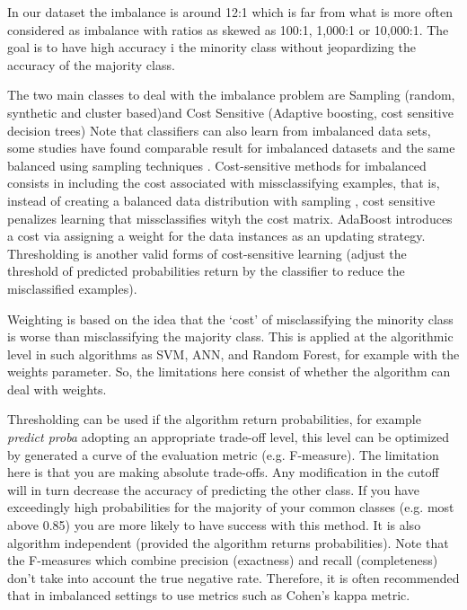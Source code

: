 \documentclass[11pt]{article}
\theoremstyle{definition}
\theoremstyle{remark}
\begin{document}
In our dataset the imbalance is around 12:1 which is far from what is more often considered as imbalance with ratios as skewed as 100:1, 1,000:1 or 10,000:1\cite{he2009learning}.
The goal is to have high accuracy i the minority class without jeopardizing  the accuracy of the majority class.

The two main classes to deal with the imbalance problem are Sampling (random, synthetic and cluster based)and Cost Sensitive (Adaptive boosting, cost sensitive decision trees) 
Note that classifiers can also learn from imbalanced data sets, some studies have found comparable result for imbalanced datasets and the same balanced using sampling techniques \cite{japkowicz2002class}.
Cost-sensitive methods for imbalanced consists in including the cost associated with missclassifying examples, that is, instead of creating a balanced data distribution with sampling , cost sensitive penalizes learning that missclassifies wityh the cost matrix. AdaBoost introduces a cost via assigning a weight for the data instances as an updating strategy. Thresholding is another valid forms of cost-sensitive learning (adjust the threshold of predicted probabilities return by the classifier to reduce the misclassified examples).

Weighting is based on the idea that the ‘cost’ of misclassifying the minority class is worse than misclassifying the majority  class. This is applied at the algorithmic level in such algorithms as SVM, ANN, and Random Forest, for example with the weights parameter. So, the limitations here consist of whether the algorithm can deal with weights.


Thresholding can be used if the algorithm return probabilities, for example \textit{predict proba} adopting an appropriate trade-off level, this level can be optimized by generated a curve of the evaluation metric (e.g. F-measure). The limitation here is that you are making absolute trade-offs. Any modification in the cutoff will in turn decrease the accuracy of predicting the other class. If you have exceedingly high probabilities for the majority of your common classes (e.g. most above 0.85) you are more likely to have success with this method. It is also algorithm independent (provided the algorithm returns probabilities).
Note that the F-measures which combine precision (exactness) and recall (completeness) don’t take into account the true negative rate. Therefore, it is often recommended that in imbalanced settings to use metrics such as Cohen’s kappa metric.
\end{document}
